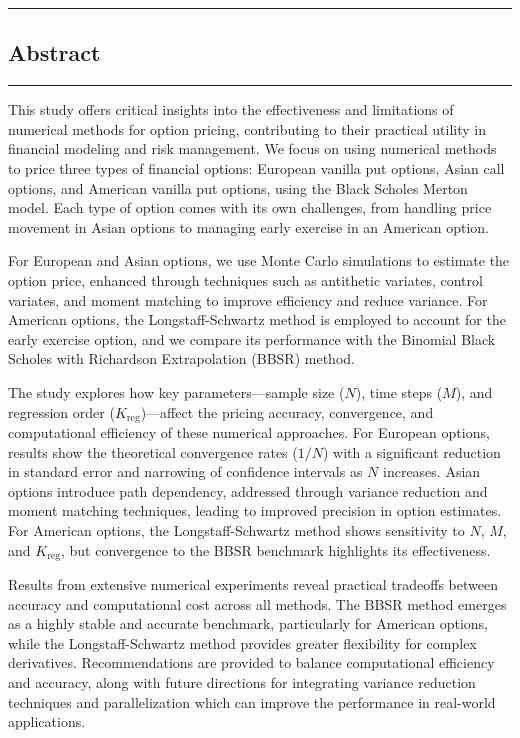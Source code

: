 {\color{gray}\hrule}
\begin{center}
\section{Abstract}
\bigskip
\end{center}
{\color{gray}\hrule}
\vspace{0.5cm}
This study offers critical insights into the effectiveness and limitations of numerical methods for option pricing, contributing to their practical utility in financial modeling and risk management. We focus on using numerical methods to price three types of financial options: European vanilla put options, Asian call options, and American vanilla put options, using the Black Scholes Merton model. Each type of option comes with its own challenges, from handling price movement in Asian options to managing early exercise in an American option.

For European and Asian options, we use Monte Carlo simulations to estimate the option price, enhanced through techniques such as antithetic variates, control variates, and moment matching to improve efficiency and reduce variance. For American options, the Longstaff-Schwartz method is employed to account for the early exercise option, and we compare its performance with the Binomial Black Scholes with Richardson Extrapolation (BBSR) method.

The study explores how key parameters—sample size (\(N\)), time steps (\(M\)), and regression order (\(K_{\text{reg}}\))—affect the pricing accuracy, convergence, and computational efficiency of these numerical approaches. For European options, results show the theoretical convergence rates (\(1 / N\)) with a significant reduction in standard error and narrowing of confidence intervals as \(N\) increases. Asian options introduce path dependency, addressed through variance reduction and moment matching techniques, leading to improved precision in option estimates. For American options, the Longstaff-Schwartz method shows sensitivity to \(N\), \(M\), and \(K_{\text{reg}}\), but convergence to the BBSR benchmark highlights its effectiveness.

Results from extensive numerical experiments reveal practical tradeoffs between accuracy and computational cost across all methods. The BBSR method emerges as a highly stable and accurate benchmark, particularly for American options, while the Longstaff-Schwartz method provides greater flexibility for complex derivatives. Recommendations are provided to balance computational efficiency and accuracy, along with future directions for integrating variance reduction techniques and parallelization which can improve the performance in real-world applications.

